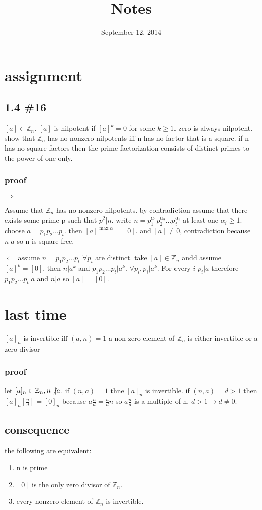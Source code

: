 \documentclass[letterpaper]{article}
\begin{document}
\title{Notes}
\date{September 12, 2014}
\maketitle
\section*{assignment}
\subsection*{1.4 \#16}
$[a]\in\mathbb{Z}_n$. $[a]$ is nilpotent if $[a]^k=0$ for some $k\ge 1$. zero is always nilpotent. show that $\mathbb{Z}_n$ has no nonzero nilpotents iff n has no factor that is a square. if n has no square factors then the prime factorization consists of distinct primes to the power of one only.
\subsubsection*{proof}
$\Rightarrow$

Assume that $\mathbb{Z}_n$ has no nonzero nilpotents. by contradiction assume that there exists some prime p such that $p^2|n$. write $n=p_1^{\alpha_1}p_2^{\alpha_2}\dots p_t^{\alpha_t}$ at least one $\alpha_i\ge1$. choose $a=p_1p_2\dots p_t$. then $[a]^{\max\alpha}=[0]$. and $[a]\ne0$, contradiction because $n|a$ so n is square free.

$\Leftarrow$
assume $n=p_1p_2\dots p_t$ $\forall p_i$ are distinct.
take $[a]\in\mathbb{Z}_n$ andd assume $[a]^k=[0]$.
then $n|a^k$ and $p_1p_2\dots p_t|a^k$. $\forall p_i, p_i|a^k$.
For every $i$ $p_i|a$ therefore $p_1p_2\dots p_t|a$ and $n|a$ so $[a]=[0]$.
\section*{last time}
$[a]_n$ is invertible iff $(a,n)=1$
a non-zero element of $\mathbb{Z}_n$ is either invertible or a zero-divisor

\subsubsection*{proof}
let $[a]_n\in\mathbb{Z}_n, n\not\vert a$. if $(n,a)=1$ thne $[a]_n$ is invertible. if $(n,a)=d>1$ then $[a]_n[\frac{n}{d}]=[0]_n$ because $a\frac{n}{d}=\frac{a}{d}n$ so $a\frac{n}{d}$ is a multiple of n. $d>1\to d\ne0$.
\subsection*{consequence}
the following are equivalent:
\begin{enumerate}
\item
n  is prime
\item
$[0]$ is the only zero divisor of $\mathbb{Z}_n$.
\item
every  nonzero element of $\mathbb{Z}_n$ is invertible.
\end{enumerate}
\end{document}
